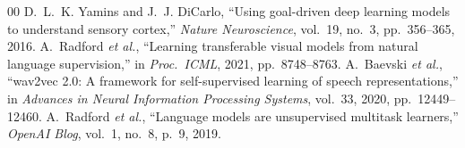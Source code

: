 \documentclass[conference]{IEEEtran}
\begin{document}
\begin{thebibliography}{00}
 D.~L.~K. Yamins and J.~J. DiCarlo, ``Using goal-driven deep learning models to understand sensory cortex,'' \textit{Nature Neuroscience}, vol.~19, no.~3, pp.~356--365, 2016.
 A.~Radford \textit{et al.}, ``Learning transferable visual models from natural language supervision,'' in \textit{Proc.~ICML}, 2021, pp.~8748--8763.
 A.~Baevski \textit{et al.}, ``wav2vec 2.0: A framework for self-supervised learning of speech representations,'' in \textit{Advances in Neural Information Processing Systems}, vol.~33, 2020, pp.~12449--12460.
 A.~Radford \textit{et al.}, ``Language models are unsupervised multitask learners,'' \textit{OpenAI Blog}, vol.~1, no.~8, p.~9, 2019.
\end{thebibliography}
\end{document}
